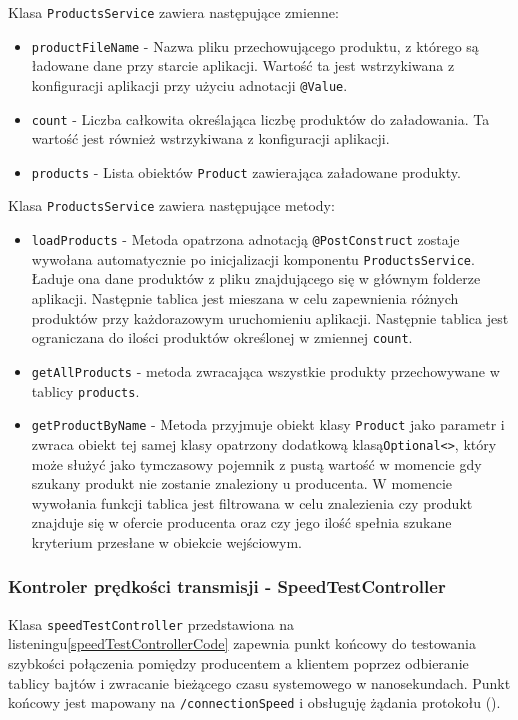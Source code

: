 Klasa \verb|ProductsService| zawiera następujące zmienne:
\begin{itemize}
    \item \verb|productFileName| - Nazwa pliku przechowującego produktu, z którego są ładowane dane przy starcie aplikacji. Wartość ta jest wstrzykiwana z konfiguracji aplikacji przy użyciu adnotacji \verb|@Value|.
    \item \verb|count| -  Liczba całkowita określająca liczbę produktów do załadowania. Ta wartość jest również wstrzykiwana z konfiguracji aplikacji.
    \item \verb|products| - Lista obiektów \verb|Product| zawierająca załadowane produkty.
\end{itemize}

Klasa \verb|ProductsService| zawiera następujące metody:
\begin{itemize}
    \item \verb|loadProducts| - Metoda opatrzona adnotacją \verb|@PostConstruct| zostaje wywołana automatycznie po inicjalizacji komponentu \verb|ProductsService|. Ładuje ona dane produktów z pliku znajdującego się w głównym folderze aplikacji. Następnie tablica jest mieszana w celu zapewnienia różnych produktów przy każdorazowym uruchomieniu aplikacji. Następnie tablica jest ograniczana do ilości produktów określonej w zmiennej \verb|count|.
    \item \verb|getAllProducts| - metoda zwracająca wszystkie produkty przechowywane w tablicy \verb|products|.
    \item \verb|getProductByName| - Metoda przyjmuje obiekt klasy \verb|Product| jako parametr i zwraca obiekt tej samej klasy opatrzony dodatkową klasą\verb|Optional<>|, który może służyć jako tymczasowy pojemnik z pustą wartość w momencie gdy szukany produkt nie zostanie znaleziony u producenta. W momencie wywołania funkcji tablica jest filtrowana w celu znalezienia czy produkt znajduje się w ofercie producenta oraz czy jego ilość spełnia szukane kryterium przesłane w obiekcie wejściowym.
\end{itemize}

\subsubsection{Kontroler prędkości transmisji - SpeedTestController}

Klasa \verb|speedTestController| przedstawiona na listeningu\ref{speedTestControllerCode} zapewnia punkt końcowy do testowania szybkości połączenia pomiędzy producentem a klientem poprzez odbieranie tablicy bajtów i zwracanie bieżącego czasu systemowego w nanosekundach. Punkt końcowy jest mapowany na \verb|/connectionSpeed| i obsługuję żądania  protokołu  ().

